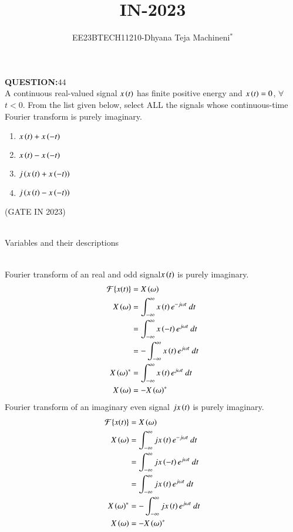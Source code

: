 \documentclass[journal,12pt,twocolumn]{IEEEtran}
\theoremstyle{remark}
\begin{document}

\vspace{3cm}
\title{\textbf{IN-2023}}
\author{EE23BTECH11210-Dhyana Teja Machineni$^{*}$%
}
\maketitle
\newpage
\bigskip

\textbf{QUESTION:$44$}\\
A continuous real-valued signal $x\left(t\right)$ has finite positive energy and $x\left(t\right) = 0$, $\forall$ $t < 0$. From the list given below, select ALL the signals whose
continuous-time Fourier transform is purely imaginary.\\
\begin{enumerate}
\item$x\left(t\right) + x\left(-t\right)$
\item$x\left(t\right) - x\left(-t\right)$
\item$j\left(x\left(t\right) + x\left(-t\right)\right)$
\item$j\left(x\left(t\right) - x\left(-t\right)\right)$
\end{enumerate}
\hfill{(GATE IN 2023)}\\
\solution\\
\begin{table}[h]
         \label{tab:table}
         
         \caption{Variables and their descriptions}
     \end{table}\\
Fourier transform of an real and odd signal$x\left(t\right)$ is purely imaginary.\\
\begin{align}
\mathcal{F}\{x(t)\} &= X\brak{\omega}\\
X\brak{\omega}&=\int_{-\infty}^{\infty} x\brak{t} e^{-j \omega t} \ dt\\
&=\int_{-\infty}^{\infty} x\brak{-t} e^{j \omega t} \ dt\\
&=-\int_{-\infty}^{\infty} x\brak{t} e^{j \omega t} \ dt\\
X\brak{\omega}^*&=\int_{-\infty}^{\infty} x\brak{t} e^{j \omega t} \ dt\\
X\brak{\omega}&=-X\brak{\omega}^*
\end{align}
 Fourier transform of an imaginary even signal $jx\left(t\right)$ is purely imaginary.\\
\begin{align}
\mathcal{F}\{x(t)\} &= X\brak{\omega}\\
X\brak{\omega}&=\int_{-\infty}^{\infty} jx\brak{t} e^{-j \omega t} \ dt\\
&=\int_{-\infty}^{\infty} jx\brak{-t} e^{j \omega t} \ dt\\
&=\int_{-\infty}^{\infty} jx\brak{t} e^{j \omega t} \ dt\\
X\brak{\omega}^*&=-\int_{-\infty}^{\infty} jx\brak{t} e^{j \omega t} \ dt\\
X\brak{\omega}&=-X\brak{\omega}^*
\end{align}
\end{document}
